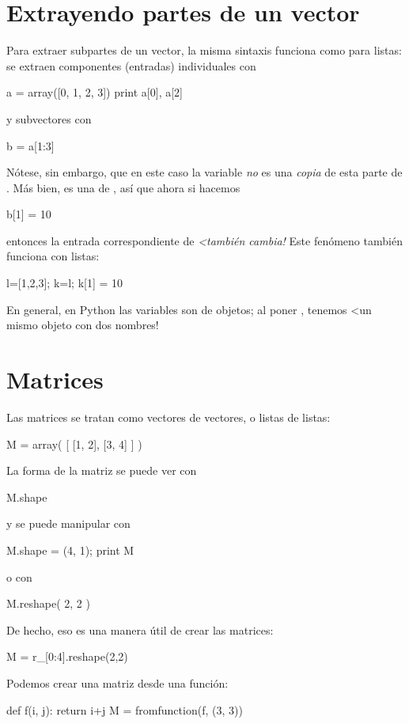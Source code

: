 \section{Extrayendo partes de un vector}
Para extraer subpartes de un vector, la misma sintaxis funciona como para listas: se extraen componentes (entradas) individuales con
\begin{python}
a = array([0, 1, 2, 3])
print a[0], a[2]
\end{python}
y subvectores con
\begin{python}
b = a[1:3]
\end{python}
Nótese, sin embargo, que en este caso la variable  \emph{no} es una \emph{copia} de esta parte de . Más bien, es una  de , así que ahora si hacemos
\begin{python}
b[1] = 10
\end{python}
entonces la entrada correspondiente de  \emph{<también cambia!} Este fenómeno también funciona con listas:
\begin{python}
l=[1,2,3]; k=l; k[1] = 10
\end{python}
En general, en Python las variables son  de objetos; al poner , tenemos <un mismo objeto con dos nombres!

\section{Matrices}
Las matrices se tratan como vectores de vectores, o listas de listas:
\begin{python}
M = array( [ [1, 2], [3, 4] ] )
\end{python}
La forma de la matriz se puede ver con
\begin{python}
M.shape
\end{python}
y se puede manipular con
\begin{python}
M.shape = (4, 1); print M
\end{python}
o con
\begin{python}
M.reshape( 2, 2 )
\end{python}
De hecho, eso es una manera útil de crear las matrices:
\begin{python}
M = r_[0:4].reshape(2,2)
\end{python}

Podemos crear una matriz desde una función:
\begin{python}
def f(i, j):
  return i+j
M = fromfunction(f, (3, 3))
\end{python}




